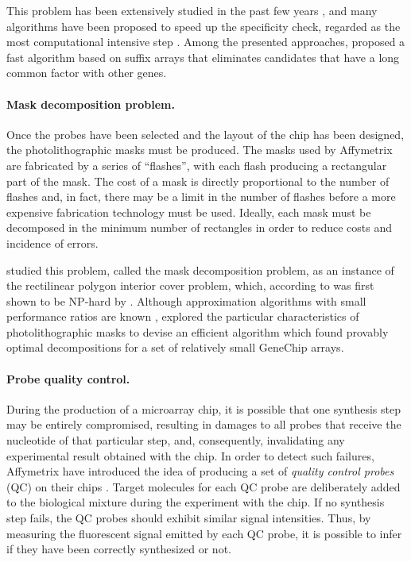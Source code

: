 This problem has been extensively studied in the past few years
\citep{Li2001,Kaderali2002,Rahmann2004}, and many algorithms have been proposed
to speed up the specificity check, regarded as the most computational intensive
step \citep{Rahmann2002,Sung2003,Chou2004}. Among the presented approaches,
\citet{Rahmann2002} proposed a fast algorithm based on suffix arrays
\citep{Manber1990} that eliminates candidates that have a long common factor
with other genes.

\paragraph{Mask decomposition problem.} Once the probes have been selected and
the layout of the chip has been designed, the photolithographic masks must be
produced. The masks used by Affymetrix are fabricated by a series of
``flashes'', with each flash producing a rectangular part of the mask. The cost
of a mask is directly proportional to the number of flashes
\citep{Hubbell1998,Hubbell1999} and, in fact, there may be a limit in the number
of flashes before a more expensive fabrication technology must be used. Ideally,
each mask must be decomposed in the minimum number of rectangles in order to
reduce costs and incidence of errors.

\citet{Hannenhalli2002} studied this problem, called the mask decomposition
problem, as an instance of the rectilinear polygon interior cover problem,
which, according to \citet{Garey1979} was first shown to be NP-hard by
\citet{Masek}. Although approximation algorithms with small performance ratios
are known \citep{Franzblau1986}, \citet{Hannenhalli2002} explored the particular
characteristics of photolithographic masks to devise an efficient algorithm
which found provably optimal decompositions for a set of relatively small
GeneChip arrays.

\paragraph{Probe quality control.} During the production of a microarray chip,
it is possible that one synthesis step may be entirely compromised, resulting in
damages to all probes that receive the nucleotide of that particular step, and,
consequently, invalidating any experimental result obtained with the chip. In
order to detect such failures, Affymetrix have introduced the idea of producing a
set of \emph{quality control probes} (QC) on their chips \citep{Affymetrix2002}.
Target molecules for each QC probe are deliberately added to the biological
mixture during the experiment with the chip. If no synthesis step fails, the QC
probes should exhibit similar signal intensities. Thus, by measuring the
fluorescent signal emitted by each QC probe, it is possible to infer if they
have been correctly synthesized or not.


